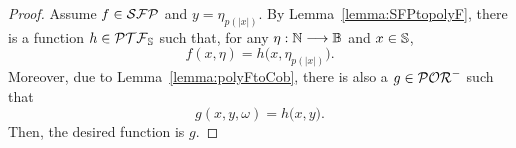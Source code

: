 \begin{proof}
Assume $f\in \mathcal{SFP}$ and $y = \eta_{p(|x|)}$.
By Lemma~\ref{lemma:SFPtopolyF},
there is a function $h\in \mathcal{PTF}_{\mathbb{S}}$ such that,
for any $\eta :\mathbb{N} \longrightarrow \mathbb{B}$ and
$x\in \mathbb{S}$,
$$
f(x,\eta) = h\big(x,\eta_{p(|x|)}\big).
$$
%
%
Moreover,
due to Lemma~\ref{lemma:polyFtoCob},
there is also a $g\in \mathcal{POR}^-$ such that
%
$$
g(x,y, \omega) = h\big( x, y \big).
$$
%
%
Then, the desired function is $g$.
\end{proof}




























































































